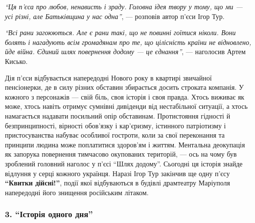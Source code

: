\begin{leftbar}
\emph{\enquote{Ця п'єса про любов, ненависть і зраду. Головна ідея твору у тому, що ми — усі
різні, але Батьківщина у нас одна}}, — розповів автор п'єси Ігор Тур.
\end{leftbar}

\begin{leftbar}
\emph{\enquote{Всі рани загоюються. Але є рани такі, що не повинні гоїтися ніколи. Вони
болять і нагадують всім громадянам про те, що цілісність країни не відновлено,
йде війна. Єдиний шлях повернення додому — це єднання}}, — наголосив Артем
Кисько.
\end{leftbar}

Дія п'єси відбувається напередодні Нового року в квартирі звичайної
пенсіонерки, де в силу різних обставин збирається досить строката компанія. У
кожного з персонажів — свій біль, своя історія і своя правда. Хтось виживає як
може, хтось навіть отримує сумнівні дивіденди від нестабільної ситуації, а
хтось намагається надавати посильний опір обставинам. Протистояння гідності й
безпринципності, вірності обов'язку і кар'єризму, істинного патріотизму і
пристосуванства набуває особливої гостроти, коли за свої переконання та
принципи людина може поплатитися здоров'ям і життям. Ментальна деокупація як
запорука повернення тимчасово окупованих територій, — ось на чому був зроблений
головний наголос у п'єсі \enquote{Шлях додому}. Сьогодні ця історія знайде відлуння у
серці кожного українця. Наразі Ігор Тур закінчив ще одну п'єсу \textbf{\enquote{Квитки
дійсні!}}, події якої відбуваються в будівлі драмтеатру Маріуполя напередодні
його знищення російським літаком.

\subsubsection{3. \enquote{Історія одного дня}}


